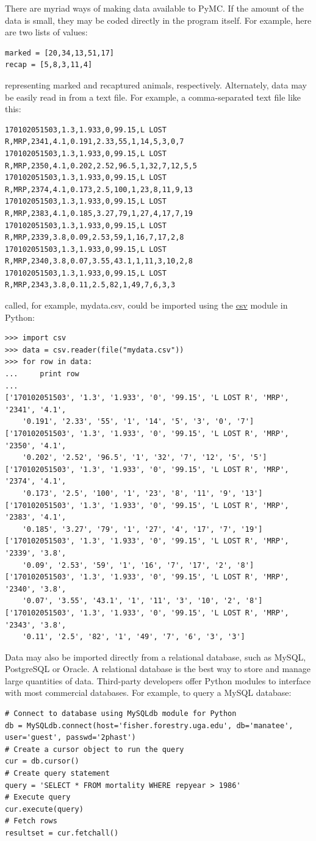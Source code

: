 \documentclass[]{book}
\begin{document}
There are myriad ways of making data available to PyMC. If the amount of the data is small, they may be coded directly in the program itself. For example, here are two lists of values:
\begin{verbatim}
marked = [20,34,13,51,17] 
recap = [5,8,3,11,4]
\end{verbatim}
representing marked and recaptured animals, respectively. Alternately, data may be easily read in from a text file. For example, a comma-separated text file like this:
\begin{verbatim}
170102051503,1.3,1.933,0,99.15,L LOST R,MRP,2341,4.1,0.191,2.33,55,1,14,5,3,0,7
170102051503,1.3,1.933,0,99.15,L LOST R,MRP,2350,4.1,0.202,2.52,96.5,1,32,7,12,5,5
170102051503,1.3,1.933,0,99.15,L LOST R,MRP,2374,4.1,0.173,2.5,100,1,23,8,11,9,13
170102051503,1.3,1.933,0,99.15,L LOST R,MRP,2383,4.1,0.185,3.27,79,1,27,4,17,7,19
170102051503,1.3,1.933,0,99.15,L LOST R,MRP,2339,3.8,0.09,2.53,59,1,16,7,17,2,8
170102051503,1.3,1.933,0,99.15,L LOST R,MRP,2340,3.8,0.07,3.55,43.1,1,11,3,10,2,8
170102051503,1.3,1.933,0,99.15,L LOST R,MRP,2343,3.8,0.11,2.5,82,1,49,7,6,3,3
\end{verbatim}
called, for example, mydata.csv, could be imported using the \href{http://docs.python.org/lib/module-csv.html}{csv} module in Python:
\begin{verbatim}
>>> import csv
>>> data = csv.reader(file("mydata.csv"))
>>> for row in data:
...     print row
...
['170102051503', '1.3', '1.933', '0', '99.15', 'L LOST R', 'MRP', '2341', '4.1',
    '0.191', '2.33', '55', '1', '14', '5', '3', '0', '7']
['170102051503', '1.3', '1.933', '0', '99.15', 'L LOST R', 'MRP', '2350', '4.1',
    '0.202', '2.52', '96.5', '1', '32', '7', '12', '5', '5']
['170102051503', '1.3', '1.933', '0', '99.15', 'L LOST R', 'MRP', '2374', '4.1',
    '0.173', '2.5', '100', '1', '23', '8', '11', '9', '13']
['170102051503', '1.3', '1.933', '0', '99.15', 'L LOST R', 'MRP', '2383', '4.1',
    '0.185', '3.27', '79', '1', '27', '4', '17', '7', '19']
['170102051503', '1.3', '1.933', '0', '99.15', 'L LOST R', 'MRP', '2339', '3.8',
    '0.09', '2.53', '59', '1', '16', '7', '17', '2', '8']
['170102051503', '1.3', '1.933', '0', '99.15', 'L LOST R', 'MRP', '2340', '3.8',
    '0.07', '3.55', '43.1', '1', '11', '3', '10', '2', '8']
['170102051503', '1.3', '1.933', '0', '99.15', 'L LOST R', 'MRP', '2343', '3.8',
    '0.11', '2.5', '82', '1', '49', '7', '6', '3', '3']
\end{verbatim}

Data may also be imported directly from a relational database, such as MySQL, PostgreSQL or Oracle. A relational database is the best way to store and manage large quantities of data. Third-party developers offer Python modules to interface with most commercial databases. For example, to query a MySQL database:
\begin{verbatim}
# Connect to database using MySQLdb module for Python
db = MySQLdb.connect(host='fisher.forestry.uga.edu', db='manatee', user='guest', passwd='2phast')
# Create a cursor object to run the query
cur = db.cursor()
# Create query statement
query = 'SELECT * FROM mortality WHERE repyear > 1986'
# Execute query
cur.execute(query)
# Fetch rows
resultset = cur.fetchall()
\end{verbatim}
\end{document}
